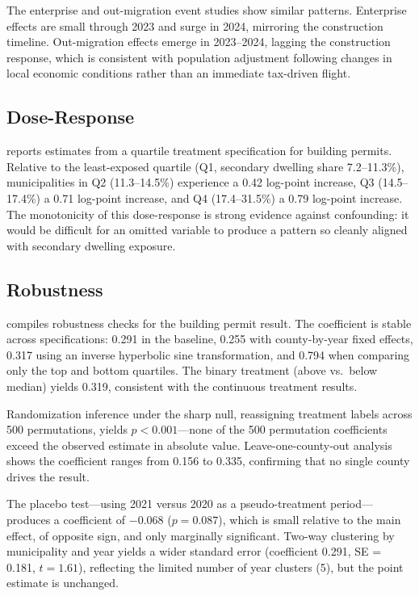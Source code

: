 \documentclass[12pt]{article}
\begin{document}
The enterprise and out-migration event studies show similar patterns. Enterprise effects are small through 2023 and surge in 2024, mirroring the construction timeline. Out-migration effects emerge in 2023--2024, lagging the construction response, which is consistent with population adjustment following changes in local economic conditions rather than an immediate tax-driven flight.



\subsection{Dose-Response}

 reports estimates from a quartile treatment specification for building permits. Relative to the least-exposed quartile (Q1, secondary dwelling share 7.2--11.3\%), municipalities in Q2 (11.3--14.5\%) experience a 0.42 log-point increase, Q3 (14.5--17.4\%) a 0.71 log-point increase, and Q4 (17.4--31.5\%) a 0.79 log-point increase. The monotonicity of this dose-response is strong evidence against confounding: it would be difficult for an omitted variable to produce a pattern so cleanly aligned with secondary dwelling exposure.



\subsection{Robustness}

 compiles robustness checks for the building permit result. The coefficient is stable across specifications: 0.291 in the baseline, 0.255 with county-by-year fixed effects, 0.317 using an inverse hyperbolic sine transformation, and 0.794 when comparing only the top and bottom quartiles. The binary treatment (above vs.\ below median) yields 0.319, consistent with the continuous treatment results.

Randomization inference under the sharp null, reassigning treatment labels across 500 permutations, yields $p < 0.001$---none of the 500 permutation coefficients exceed the observed estimate in absolute value. Leave-one-county-out analysis shows the coefficient ranges from 0.156 to 0.335, confirming that no single county drives the result.

The placebo test---using 2021 versus 2020 as a pseudo-treatment period---produces a coefficient of $-0.068$ ($p = 0.087$), which is small relative to the main effect, of opposite sign, and only marginally significant. Two-way clustering by municipality and year yields a wider standard error (coefficient 0.291, SE = 0.181, $t = 1.61$), reflecting the limited number of year clusters (5), but the point estimate is unchanged.
\end{document}
